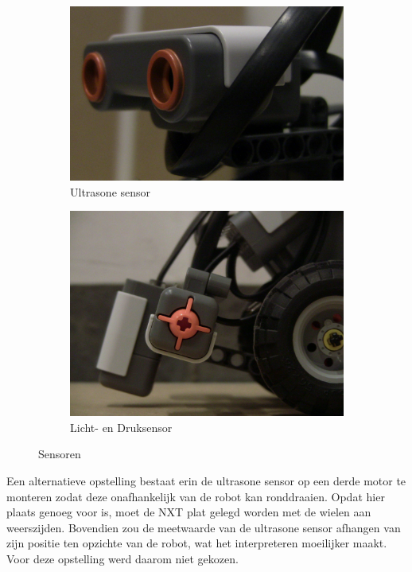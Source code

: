 \documentclass[tt3]{penoverslag}
\begin{document}
\begin{figure}
        \centering
        \begin{subfigure}[h]{0.54\textwidth}
                \centering
                \includegraphics[width=\textwidth]{robotUS}
                \caption{Ultrasone sensor}
        \end{subfigure}%
        \begin{subfigure}[h]{0.46\textwidth}
                \centering
                \includegraphics[width=\textwidth]{robotLSTS}
                \caption{Licht- en Druksensor}
        \end{subfigure}
        \caption{Sensoren}
        \label{fig:sensors}
\end{figure}

Een alternatieve opstelling bestaat erin de ultrasone sensor op een derde motor te monteren zodat deze onafhankelijk van de robot kan ronddraaien. Opdat hier plaats genoeg voor is, moet de NXT plat gelegd worden met de wielen aan weerszijden. Bovendien zou de meetwaarde van de ultrasone sensor afhangen van zijn positie ten opzichte van de robot, wat het interpreteren moeilijker maakt. Voor deze opstelling werd daarom niet gekozen.
\end{document}
